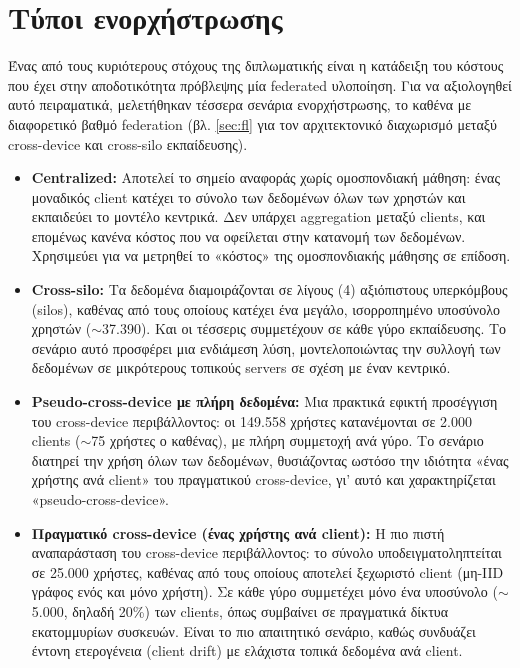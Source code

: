 \section{Τύποι ενορχήστρωσης}\label{sec:exp-orchestration}
Ένας από τους κυριότερους στόχους της διπλωματικής είναι η κατάδειξη του κόστους που έχει στην αποδοτικότητα πρόβλεψης μία federated υλοποίηση. Για να αξιολογηθεί αυτό πειραματικά, μελετήθηκαν τέσσερα σενάρια ενορχήστρωσης, το καθένα με διαφορετικό βαθμό federation (βλ. \autoref{sec:fl} για τον αρχιτεκτονικό διαχωρισμό μεταξύ cross-device και cross-silo εκπαίδευσης).

\begin{itemize}
    \item \textbf{Centralized:} Αποτελεί το σημείο αναφοράς χωρίς ομοσπονδιακή μάθηση: ένας μοναδικός client κατέχει το σύνολο των δεδομένων όλων των χρηστών και εκπαιδεύει το μοντέλο κεντρικά. Δεν υπάρχει aggregation μεταξύ clients, και επομένως κανένα κόστος που να οφείλεται στην κατανομή των δεδομένων. Χρησιμεύει για να μετρηθεί το «κόστος» της ομοσπονδιακής μάθησης σε επίδοση.
    \item \textbf{Cross-silo:} Τα δεδομένα διαμοιράζονται σε λίγους (4) αξιόπιστους υπερκόμβους (silos), καθένας από τους οποίους κατέχει ένα μεγάλο, ισορροπημένο υποσύνολο χρηστών ($\sim$37.390). Και οι τέσσερις συμμετέχουν σε κάθε γύρο εκπαίδευσης. Το σενάριο αυτό προσφέρει μια ενδιάμεση λύση, μοντελοποιώντας την συλλογή των δεδομένων σε μικρότερους τοπικούς servers σε σχέση με έναν κεντρικό.
    \item \textbf{Pseudo-cross-device με πλήρη δεδομένα:} Μια πρακτικά εφικτή προσέγγιση του cross-device περιβάλλοντος: οι 149.558 χρήστες κατανέμονται σε 2.000 clients ($\sim$75 χρήστες ο καθένας), με πλήρη συμμετοχή ανά γύρο. Το σενάριο διατηρεί την χρήση όλων των δεδομένων, θυσιάζοντας ωστόσο την ιδιότητα «ένας χρήστης ανά client» του πραγματικού cross-device, γι' αυτό και χαρακτηρίζεται «pseudo-cross-device».
    \item \textbf{Πραγματικό cross-device (ένας χρήστης ανά client):} Η πιο πιστή αναπαράσταση του cross-device περιβάλλοντος: το σύνολο υποδειγματοληπτείται σε 25.000 χρήστες, καθένας από τους οποίους αποτελεί ξεχωριστό client (μη-IID γράφος ενός και μόνο χρήστη). Σε κάθε γύρο συμμετέχει μόνο ένα υποσύνολο ($\sim$5.000, δηλαδή 20\%) των clients, όπως συμβαίνει σε πραγματικά δίκτυα εκατομμυρίων συσκευών. Είναι το πιο απαιτητικό σενάριο, καθώς συνδυάζει έντονη ετερογένεια (client drift) με ελάχιστα τοπικά δεδομένα ανά client.
\end{itemize}

